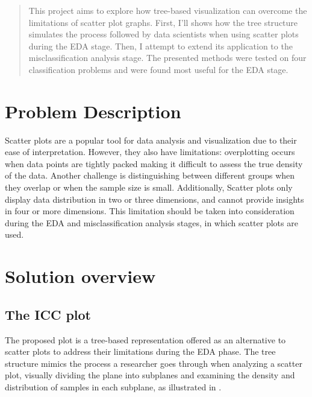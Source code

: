 \documentclass[11pt]{article}
\begin{document}
\maketitle

\begin{abstract}
This project aims to explore how tree-based visualization can overcome the limitations of scatter plot graphs. First, I'll shows how the tree structure simulates the process followed by data scientists when using scatter plots during the EDA stage. Then, I attempt to extend its application to the misclassification analysis stage. The presented methods were tested on four classification problems and were found most useful for the EDA stage.
\end{abstract}
\section{Problem Description}\label{Problem Description}
Scatter plots are a popular tool for data analysis and visualization due to their ease of interpretation. However, they also have limitations: overplotting occurs when data points are tightly packed making it difficult to assess the true density of the data. Another challenge is distinguishing between different groups when they overlap or when the sample size is small. Additionally, Scatter plots only display data distribution in two or three dimensions, and cannot provide insights in four or more dimensions. This limitation should be taken into consideration during the EDA and misclassification analysis stages, in which scatter plots are used.
\section{Solution overview}\label{Solution overview}
\subsection{The ICC plot}\label{The ICC plot}
The proposed plot is a tree-based representation offered as an alternative to scatter plots to address their limitations during the EDA phase. The tree structure mimics the process a researcher goes through when analyzing a scatter plot, visually dividing the plane into subplanes and examining the density and distribution of samples in each subplane, as illustrated in .
\end{document}
